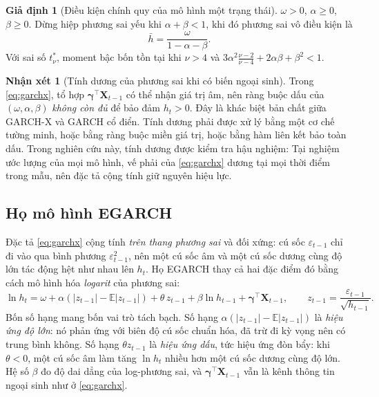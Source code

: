 \documentclass[12pt,a4paper]{article}
\numberwithin{equation}{section}
\theoremstyle{definition}
\newtheorem{assumption}{Giả định}[section]
\newtheorem{remark}{Nhận xét}[section]
\newcommand{\E}{\mathbb{E}}
\newcommand{\Xvec}{\symbf{X}}
\newcommand{\bmgamma}{\symbf{\gamma}}
\begin{document}
	\begin{assumption}[Điều kiện chính quy của mô hình một trạng thái]\label{as:single}
		$\omega>0$, $\alpha\ge 0$, $\beta\ge 0$. Dừng hiệp phương sai yếu khi $\alpha+\beta<1$,
		khi đó phương sai vô điều kiện là
		\begin{equation}
			\bar h=\frac{\omega}{1-\alpha-\beta}.
			\label{eq:garch-unconditional-var}
		\end{equation}
		Với sai số $t^{*}_{\nu}$, moment bậc bốn tồn tại khi $\nu>4$ và
		$3\alpha^{2}\frac{\nu-2}{\nu-4}+2\alpha\beta+\beta^{2}<1$.
	\end{assumption}
	
	\begin{remark}[Tính dương của phương sai khi có biến ngoại sinh]\label{rem:positivity}
		Trong \eqref{eq:garchx}, tổ hợp $\bmgamma^{\top}\Xvec_{t-1}$ có thể nhận giá trị âm, nên
		ràng buộc dấu của $(\omega,\alpha,\beta)$ \emph{không còn đủ} để bảo đảm $h_t>0$. Đây là
		khác biệt bản chất giữa GARCH-X và GARCH cổ điển. Tính dương phải được xử lý bằng một cơ
		chế tường minh, hoặc bằng ràng buộc miền giá trị, hoặc bằng hàm liên kết bảo toàn dấu.
		Trong nghiên cứu này, tính dương được kiểm tra hậu nghiệm: Tại nghiệm ước lượng của mọi
		mô hình, vế phải của \eqref{eq:garchx} dương tại mọi thời điểm trong mẫu, nên đặc tả cộng
		tính giữ nguyên hiệu lực.
	\end{remark}

	\subsection{Họ mô hình EGARCH}\label{subsec:egarch}
	Đặc tả \eqref{eq:garchx} cộng tính \emph{trên thang phương sai} và đối xứng: cú sốc
	$\varepsilon_{t-1}$ chỉ đi vào qua bình phương $\varepsilon_{t-1}^{2}$, nên một cú sốc âm
	và một cú sốc dương cùng độ lớn tác động hệt như nhau lên $h_t$. Họ EGARCH
	\cite{nelson1991} thay cả hai đặc điểm đó bằng cách mô hình hóa \emph{logarit} của phương
	sai:
	\begin{equation}
		\ln h_t=\omega+\alpha\left(\lvert z_{t-1}\rvert-\E\lvert z_{t-1}\rvert\right)
		+\theta\,z_{t-1}+\beta\ln h_{t-1}+\bmgamma^{\top}\Xvec_{t-1},
		\qquad z_{t-1}=\frac{\varepsilon_{t-1}}{\sqrt{h_{t-1}}}.
		\label{eq:egarchx}
	\end{equation}
	Bốn số hạng mang bốn vai trò tách bạch. Số hạng $\alpha(\lvert z_{t-1}\rvert-\E\lvert
	z_{t-1}\rvert)$ là \emph{hiệu ứng độ lớn}: nó phản ứng với biên độ cú sốc chuẩn hóa, đã
	trừ đi kỳ vọng nên có trung bình không. Số hạng $\theta z_{t-1}$ là \emph{hiệu ứng dấu},
	tức hiệu ứng đòn bẩy: khi $\theta<0$, một cú sốc âm làm tăng $\ln h_t$ nhiều hơn một cú
	sốc dương cùng độ lớn. Hệ số $\beta$ đo độ dai dẳng của log-phương sai, và
	$\bmgamma^{\top}\Xvec_{t-1}$ vẫn là kênh thông tin ngoại sinh như ở \eqref{eq:garchx}.
\end{document}
